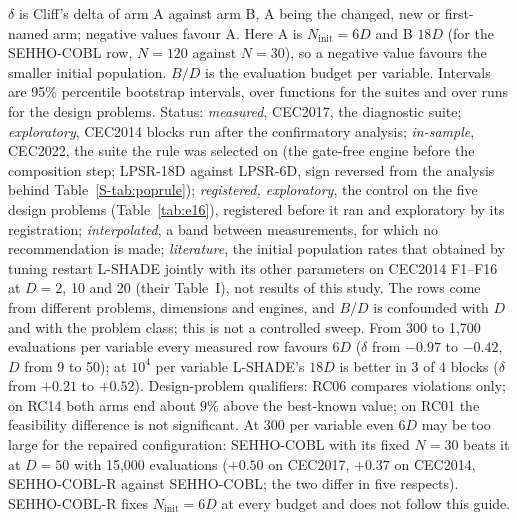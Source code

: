 \begin{table}[htbp]
{\begin{tabular}{rrllccll}
\bottomrule
\end{tabular}}
\begin{flushleft}\footnotesize
$\delta$ is Cliff's delta of arm A against arm B, A being the changed, new or first-named arm; negative values favour A. Here A is $N_{\text{init}}=6D$ and B $18D$ (for the SEHHO-COBL row, $N=120$ against $N=30$), so a negative value favours the smaller initial population. $B/D$ is the evaluation budget per variable. Intervals are 95\% percentile bootstrap intervals, over functions for the suites and over runs for the design problems. Status: \emph{measured}, CEC2017, the diagnostic suite; \emph{exploratory}, CEC2014 blocks run after the confirmatory analysis; \emph{in-sample}, CEC2022, the suite the rule was selected on (the gate-free engine before the composition step; LPSR-18D against LPSR-6D, sign reversed from the analysis behind Table~\ref{S-tab:poprule}); \emph{registered, exploratory}, the control on the five design problems (Table~\ref{tab:e16}), registered before it ran and exploratory by its registration; \emph{interpolated}, a band between measurements, for which no recommendation is made; \emph{literature}, the initial population rates that \citet{tanabe2015tuning} obtained by tuning restart L-SHADE jointly with its other parameters on CEC2014 F1--F16 at $D=2$, 10 and 20 (their Table~I), not results of this study. The rows come from different problems, dimensions and engines, and $B/D$ is confounded with $D$ and with the problem class; this is not a controlled sweep. From 300 to 1{,}700 evaluations per variable every measured row favours $6D$ ($\delta$ from $-0.97$ to $-0.42$, $D$ from 9 to 50); at $10^4$ per variable L-SHADE's $18D$ is better in 3 of 4 blocks ($\delta$ from $+0.21$ to $+0.52$). Design-problem qualifiers: RC06 compares violations only; on RC14 both arms end about 9\% above the best-known value; on RC01 the feasibility difference is not significant. At 300 per variable even $6D$ may be too large for the repaired configuration: SEHHO-COBL with its fixed $N=30$ beats it at $D=50$ with 15{,}000 evaluations ($+0.50$ on CEC2017, $+0.37$ on CEC2014, SEHHO-COBL-R against SEHHO-COBL; the two differ in five respects). SEHHO-COBL-R fixes $N_{\text{init}}=6D$ at every budget and does not follow this guide.
\end{flushleft}
\end{table}

